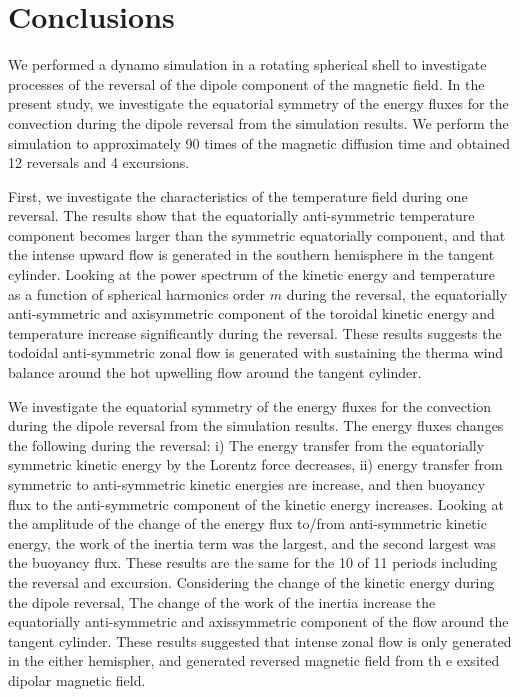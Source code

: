\section{Conclusions}
\label{section:conclusion}

We performed a dynamo simulation in a rotating spherical shell to investigate processes of the reversal of the dipole component of the magnetic field. In the present study, we investigate the equatorial symmetry of the energy fluxes for the convection during the dipole reversal from the simulation results. We perform the simulation to approximately 90 times of the magnetic diffusion time and obtained 12 reversals and 4 excursions.

First, we investigate the characteristics of the temperature field during one reversal. The results show that the equatorially anti-symmetric temperature component becomes larger than the symmetric equatorially component, and that the intense upward flow is generated in the southern hemisphere in the tangent cylinder. Looking at the power spectrum of the kinetic energy and temperature as a function of spherical harmonics order $m$ during the reversal, the equatorially anti-symmetric and axisymmetric component of the toroidal kinetic energy and temperature increase significantly during the reversal. These results suggests the todoidal anti-symmetric zonal flow is generated with sustaining the therma wind balance around the hot upwelling flow around the tangent cylinder.

We investigate the equatorial symmetry of the energy fluxes for the convection during the dipole reversal from the simulation results. The energy fluxes changes the following during the reversal: i) The energy transfer from the equatorially symmetric kinetic energy by the Lorentz force decreases, ii) energy transfer from symmetric to anti-symmetric kinetic energies are increase, and then buoyancy flux to the anti-symmetric component of the kinetic energy increases. Looking at the amplitude of the change of the energy flux to/from anti-symmetric kinetic energy, the work of the inertia term was the largest, and the second largest was the buoyancy flux. These results are the same for the 10 of 11 periods including the reversal and excursion. Considering the change of the kinetic energy during the dipole reversal, The change of the work of the inertia increase the equatorially anti-symmetric and axissymmetric component of the flow around the tangent cylinder. These results suggested that intense zonal flow is only generated in the either hemispher, and generated reversed magnetic field from th
e exsited dipolar magnetic field.